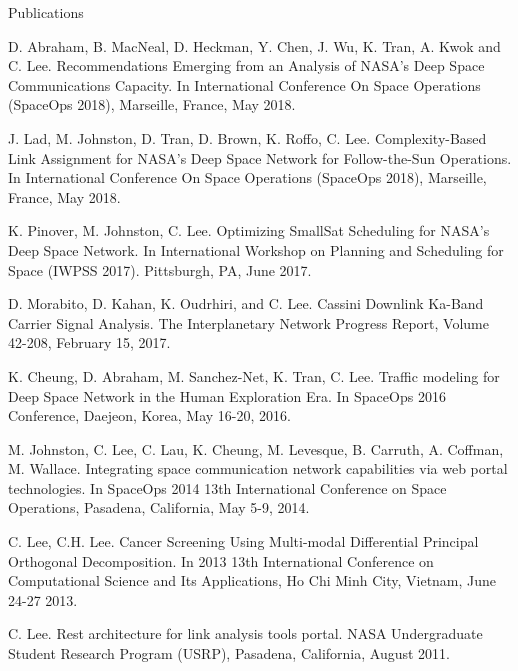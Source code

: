 \documentclass{resume} %
\begin{document}
\begin{rSection}{Publications}
\item D. Abraham, B. MacNeal, D. Heckman, Y. Chen, J. Wu, K. Tran, A. Kwok and C. Lee. Recommendations Emerging from an Analysis of NASA’s Deep Space Communications Capacity. In International Conference On Space Operations (SpaceOps 2018), Marseille, France, May 2018. 


\item J. Lad, M. Johnston, D. Tran, D. Brown, K. Roffo, C. Lee. Complexity-Based Link Assignment for NASA’s Deep Space Network for Follow-the-Sun Operations. In International Conference On Space Operations (SpaceOps 2018), Marseille, France, May 2018. 

\item K. Pinover, M. Johnston, C. Lee. Optimizing SmallSat Scheduling for NASA’s Deep Space Network. In International Workshop on Planning and Scheduling for Space (IWPSS 2017). Pittsburgh, PA, June 2017. 


\item D. Morabito, D. Kahan, K. Oudrhiri, and C. Lee. Cassini Downlink Ka-Band Carrier Signal Analysis. The Interplanetary Network Progress Report, Volume 42-208, February 15, 2017. 


\item K. Cheung, D. Abraham, M. Sanchez-Net, K. Tran, C. Lee. Traffic modeling for Deep Space Network in the Human Exploration Era. In SpaceOps 2016 Conference, Daejeon, Korea, May 16-20, 2016.


\item M. Johnston, C. Lee, C. Lau, K. Cheung, M. Levesque, B. Carruth, A. Coffman, M. Wallace. Integrating space communication network capabilities via web portal technologies. In SpaceOps 2014 13th International Conference on Space Operations, Pasadena, California, May 5-9, 2014. 


\item C. Lee, C.H. Lee. Cancer Screening Using Multi-modal Differential Principal Orthogonal Decomposition. In 2013 13th International Conference on Computational Science and Its Applications, Ho Chi Minh City, Vietnam, June 24-27 2013.


\item C. Lee. Rest architecture for link analysis tools portal. NASA Undergraduate Student Research Program (USRP), Pasadena, California, August 2011. 




\end{rSection}






\end{document}

